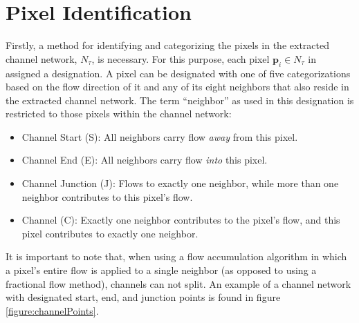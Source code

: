 \section{Pixel Identification}
\label{section:PixelIdentification}

Firstly, a method for identifying and categorizing the pixels in the extracted channel network, $N_{\tau}$, is necessary. For this purpose, each pixel $\textbf{p}_{i} \in N_{\tau}$ 
in assigned a designation. A pixel can be designated with one of five categorizations based on the flow direction of it and any of its eight neighbors that also reside in the extracted channel network. The term ``neighbor'' as used in this designation is restricted to those pixels within the channel network:

\begin{itemize}
  \item Channel Start (S): All neighbors carry flow {\em away} from this pixel.
  \item Channel End (E): All neighbors carry flow {\em into} this pixel. %
  \item Channel Junction (J): Flows to exactly one neighbor, while more than one neighbor contributes to this pixel's flow.
  \item Channel (C): Exactly one neighbor contributes to the pixel's flow, and this pixel contributes to exactly one neighbor.
\end{itemize}

\noindent 
It is 
important to note that, when using a flow accumulation algorithm in which a pixel's entire flow is applied to a single neighbor (as opposed to using a fractional flow method), channels can not split. An example of a channel network with designated start, end, and junction points is found in figure \ref{figure:channelPoints}.

